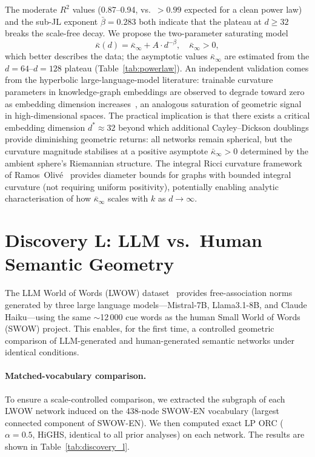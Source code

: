 \documentclass[11pt,a4paper]{article}
\newcommand{\kbar}{\bar{\kappa}}
\begin{document}
The moderate $R^2$ values (0.87--0.94, vs.\ $>0.99$ expected for a clean power law) and the sub-JL exponent $\bar\beta=0.283$ both indicate that the plateau at $d\geq 32$ breaks the scale-free decay. We propose the two-parameter saturating model
\begin{equation}
  \kbar(d) = \kbar_\infty + A\cdot d^{-\beta}, \quad \kbar_\infty > 0,
  \label{eq:saturation}
\end{equation}
which better describes the data; the asymptotic values $\kbar_\infty$ are estimated from the $d=64$--$d=128$ plateau (Table~\ref{tab:powerlaw}). An independent validation comes from the hyperbolic large-language-model literature: trainable curvature parameters in knowledge-graph embeddings are observed to degrade toward zero as embedding dimension increases~\cite{wu2025semantic}, an analogous saturation of geometric signal in high-dimensional spaces. The practical implication is that there exists a critical embedding dimension $d^* \approx 32$ beyond which additional Cayley--Dickson doublings provide diminishing geometric returns: all networks remain spherical, but the curvature magnitude stabilises at a positive asymptote $\kbar_\infty > 0$ determined by the ambient sphere's Riemannian structure. The integral Ricci curvature framework of Ramos~Oliv\'e~\cite{ramosOlive2025integral} provides diameter bounds for graphs with bounded integral curvature (not requiring uniform positivity), potentially enabling analytic characterisation of how $\kbar_\infty$ scales with $k$ as $d\to\infty$.

\section{Discovery L: LLM vs.\ Human Semantic Geometry}
\label{sec:discovery_l}

The LLM World of Words (LWOW) dataset~\cite{chankhanna2025worldofwords} provides free-association
norms generated by three large language models---Mistral-7B, Llama3.1-8B, and Claude
Haiku---using the same $\sim$12\,000 cue words as the human Small World of Words (SWOW) project.
This enables, for the first time, a controlled geometric comparison of LLM-generated and
human-generated semantic networks under identical conditions.

\paragraph{Matched-vocabulary comparison.}
To ensure a scale-controlled comparison, we extracted the subgraph of each LWOW network induced
on the 438-node SWOW-EN vocabulary (largest connected component of SWOW-EN).
We then computed exact LP ORC ($\alpha=0.5$, HiGHS, identical to all prior analyses)
on each network. The results are shown in Table~\ref{tab:discovery_l}.
\end{document}
